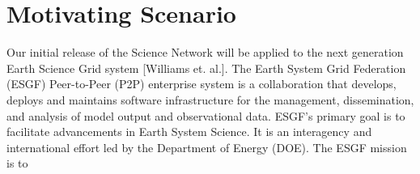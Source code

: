 \section{Motivating Scenario}

Our initial release of the Science Network will be applied to the next generation Earth Science Grid system [Williams et. al.]. The Earth System Grid Federation (ESGF) Peer-to-Peer (P2P) enterprise system is a collaboration that develops, deploys and maintains software infrastructure for the management, dissemination, and analysis of model output and observational data. ESGF's primary goal is to facilitate advancements in Earth System Science. It is an interagency and international effort led by the Department of Energy (DOE). The ESGF mission is to